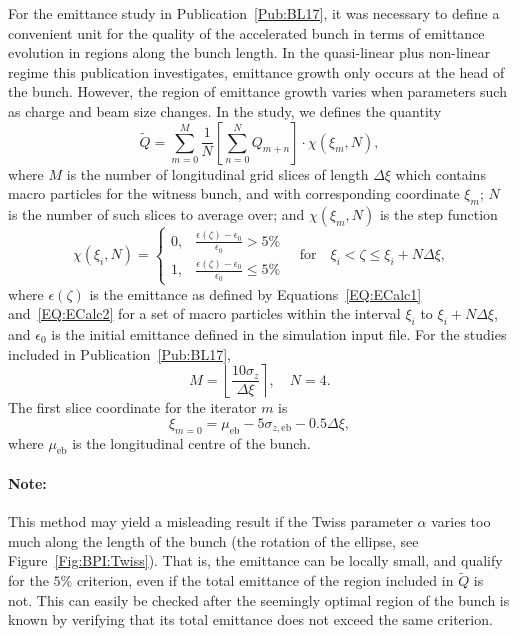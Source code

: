 For the emittance study in Publication~\ref{Pub:BL17}, it was necessary to define a convenient unit for the quality of the accelerated bunch in terms of emittance evolution in regions along the bunch length.
In the quasi-linear plus non-linear regime this publication investigates, emittance growth only occurs at the head of the bunch.
However, the region of emittance growth varies when parameters such as charge and beam size changes.
In the study, we defines the quantity
\begin{equation}
    \tilde{Q} = \sum_{m=0}^{M} \frac{1}{N} \left[\sum_{n=0}^{N} Q_{m+n}\right] \cdot \chi(\xi_{m},N),
\end{equation}
where $M$ is the number of longitudinal grid slices of length $\Delta\xi$ which contains macro particles for the witness bunch, and with corresponding coordinate $\xi_{m}$; $N$ is the number of such slices to average over; and $\chi(\xi_{m},N)$ is the step function
\begin{equation}
    \chi(\xi_{i},N) =
    \begin{cases}
        0, & \frac{\epsilon(\zeta) - \epsilon_{0}}{\epsilon_{0}} > 5\% \\
        1, & \frac{\epsilon(\zeta) - \epsilon_{0}}{\epsilon_{0}} \leq 5\%
    \end{cases}
    \quad\mathrm{for}\quad
    \xi_{i} < \zeta \leq \xi_{i} + N\Delta\xi,
\end{equation}
where $\epsilon(\zeta)$ is the emittance as defined by Equations~\ref{EQ:ECalc1} and~\ref{EQ:ECalc2} for a set of macro particles within the interval $\xi_{i}$ to $\xi_{i} + N\Delta\xi$, and $\epsilon_{0}$ is the initial emittance defined in the simulation input file.
For the studies included in Publication~\ref{Pub:BL17},
\begin{equation}
    M = \left\lfloor \frac{10\sigma_{z}}{\Delta\xi} \right\rceil, \quad
    N = 4.
\end{equation}
The first slice coordinate for the iterator $m$ is
\begin{equation}
    \xi_{m=0} = \mu_{\mathrm{eb}} - 5\sigma_{z,\mathrm{eb}} - 0.5\Delta\xi,
\end{equation}
where $\mu_{\mathrm{eb}}$ is the longitudinal centre of the bunch.

\paragraph{Note:} This method may yield a misleading result if the Twiss parameter $\alpha$ varies too much along the length of the bunch (the rotation of the ellipse, see Figure~\ref{Fig:BPI:Twiss}).
That is, the emittance can be locally small, and qualify for the $5\%$ criterion, even if the total emittance of the region included in $\tilde{Q}$ is not.
This can easily be checked after the seemingly optimal region of the bunch is known by verifying that its total emittance does not exceed the same criterion.

